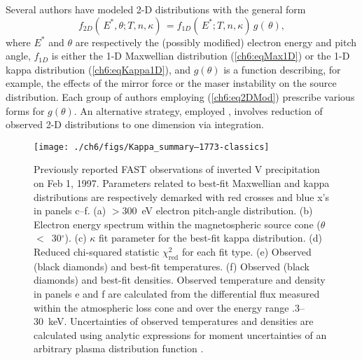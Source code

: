   Several authors \citep{Maggs1981,Bingham1999,Bingham2000,Mutel2007} have
  modeled 2-D distributions with the general form
    \begin{equation} \label{ch6:eq2DMod} f_{2D}(\, E^*, \theta ; T, n,
      \kappa) \, = f_{1D}(\, E^*; T, n, \kappa) \, g(\, \theta),
    \end{equation}
  where $E^*$ and $\theta$ are respectively the (possibly modified)
  electron energy and pitch angle, $f_{1D}$ is either the 1-D
  Maxwellian distribution (\ref{ch6:eqMax1D}) or the 1-D kappa
  distribution (\ref{ch6:eqKappa1D}), and $g(\theta )$ is a function
  describing, for example, the effects of the mirror force or the
  maser instability on the source distribution. Each group of authors
  employing (\ref{ch6:eq2DMod}) prescribe various forms for $g(\theta)$.
  An alternative strategy, employed \citet{Pritchett1999}, involves
  reduction of observed 2-D distributions to one dimension via
  integration.


  \begin{figure}
    \centering
    \noindent\texttt{[image: ./ch6/figs/Kappa\_summary--1773-classics]}
    \caption{Previously reported \citep{Elphic1998} FAST observations
      of inverted V precipitation on Feb 1, 1997. Parameters related
      to best-fit Maxwellian and kappa distributions are respectively
      demarked with red crosses and blue x's in panels c--f. (a)
      $>$300~eV electron pitch-angle distribution. (b) Electron energy
      spectrum within the magnetospheric source cone
      ($\theta$$<$~30$^\circ$). (c) $\kappa$ fit parameter for the
      best-fit kappa distribution. (d) Reduced chi-squared statistic
      $\chi^2_{\mathrm{red}}$ for each fit type. (e) Observed (black
      diamonds) and best-fit temperatures. (f) Observed (black
      diamonds) and best-fit densities. Observed temperature and
      density in panels e and f are calculated from the differential
      flux measured within the atmospheric loss cone and over the
      energy range .3--30~keV. Uncertainties of observed temperatures
      and densities are calculated using analytic expressions for
      moment uncertainties of an arbitrary plasma distribution
      function \citep[][; see Appendix~A]{Gershman2015}.}
    \label{ch6:Fig1}
  \end{figure}

